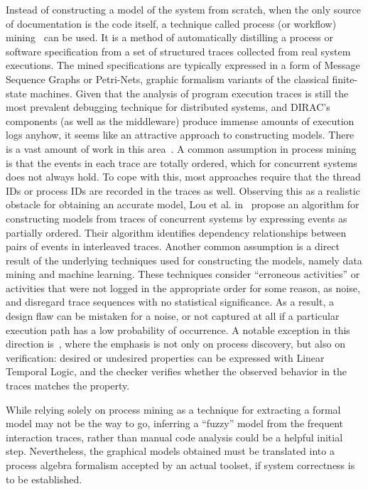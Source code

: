 \documentclass[sort&compress,preprint,3p]{elsarticle}
\begin{document}
Instead of constructing a model of the system from scratch, when the only 
source of documentation is the code itself, a technique called process (or workflow) mining~\cite{Agrawal:1998:MPM:645338.650397}
can be used. It is a method of automatically distilling a process or software specification from a set of 
structured traces collected from real system executions.
The mined specifications are typically expressed in a form of Message Sequence Graphs or Petri-Nets, 
graphic formalism variants of the classical finite-state machines. Given that the 
analysis of program execution traces is still the most prevalent debugging technique
for distributed systems, and DIRAC's components (as well as the middleware) produce
immense amounts of execution logs anyhow, it seems like an attractive approach to constructing models.
There is a vast amount of work in this area~\cite{Aalst:1997:VWN:647744.733919,Lou:2010:MPW:1835804.1835883,Walkinshaw:2008:IFM:1642931.1642962,vanderAalst:2004:WMD:1018031.1018329,Ammons:2002:MS:503272.503275}.
A common assumption in process mining is that the events in each trace are totally ordered, 
which for concurrent systems does not always hold. To cope with this, most approaches 
require that the thread IDs or process IDs are recorded in the traces as well.
Observing this as a realistic obstacle for obtaining an accurate model, Lou et al. in~\cite{Lou:2010:MPW:1835804.1835883}
propose an algorithm for constructing models from traces of concurrent systems by expressing events as partially ordered.
Their algorithm identifies dependency relationships between pairs of events in interleaved
traces. Another common assumption is a direct result of the underlying techniques used for constructing the models, namely data mining 
and machine learning. These techniques consider ``erroneous activities'' or activities that
were not logged in the appropriate order for some reason, as noise, and disregard trace sequences with no statistical significance.
As a result, a design flaw can be mistaken for a noise, or not captured at all if a particular 
execution path has a low probability of occurrence. A notable exception in this direction is~\cite{vanderAalst:2005:PMV:2099016.2099032}, where the emphasis is not only on process discovery,
but also on verification: desired or undesired properties can be expressed with Linear Temporal Logic, 
and the checker verifies whether the observed behavior in the traces matches the property.

While relying solely on process mining as a technique for extracting a formal model may not be 
the way to go, inferring a ``fuzzy'' model from the frequent interaction traces, rather than manual code analysis
could be a helpful initial step. Nevertheless, the graphical models obtained must be 
translated into a process algebra formalism accepted by an actual toolset, if system correctness is to be established.
\end{document}
